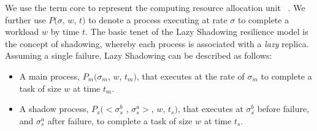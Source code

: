 



We use the term core to represent the computing resource allocation unit%
~\cite{casanova_inria_2012}. 
We further use $P(\sigma$, $w$, $t)$ to denote a process executing at rate $\sigma$ to complete a workload $w$ by time $t$.
The basic tenet of the Lazy Shadowing resilience model is the concept of shadowing, whereby each process is associated with a {\it lazy} replica. %
Assuming a single failure, Lazy Shadowing can be described as follows:
\begin{itemize}
	\item A main process, $P_m(\sigma_m$, $w$, $t_m)$, that executes at the rate of $\sigma_m$ to complete a task of size $w$ at time $t_m$.
	\item A shadow process, $P_s(<\sigma_s^b$ , $\sigma_s^a>$, $w$, $t_s)$, that executes at $\sigma_s^b$ before failure, and $\sigma_s^a$ after failure, to complete a task of size $w$ at time $t_s$.%
\end{itemize}

